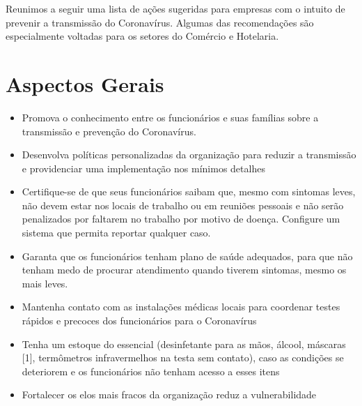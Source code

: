 \documentclass[onecolumn,journal]{IEEEtran}
\begin{document}
\begin{multicols}{2}


Reunimos a seguir uma lista de ações sugeridas para empresas com o intuito de prevenir a transmissão do Coronavírus. Algumas das recomendações são especialmente voltadas para os setores do Comércio e Hotelaria.

\section*{Aspectos Gerais}
\begin{itemize}
\item Promova o conhecimento entre os funcionários e suas famílias sobre a transmissão e prevenção do Coronavírus.
\item Desenvolva políticas personalizadas da organização para reduzir a transmissão e providenciar uma implementação nos mínimos detalhes
\item Certifique-se de que seus funcionários saibam que, mesmo com sintomas leves, não devem estar nos locais de trabalho ou em reuniões pessoais e não serão penalizados por faltarem no trabalho por motivo de doença. Configure um sistema que permita reportar qualquer caso.
\item Garanta que os funcionários tenham plano de saúde adequados, para que não tenham medo de procurar atendimento quando tiverem sintomas, mesmo os mais leves.
\item Mantenha contato com as instalações médicas locais para coordenar testes rápidos e precoces dos funcionários para o Coronavírus
\item Tenha um estoque do essencial (desinfetante para as mãos, álcool, máscaras [1], termômetros infravermelhos na testa sem contato), caso as condições se deteriorem e os funcionários não tenham acesso a esses itens
\item Fortalecer os elos mais fracos da organização reduz a vulnerabilidade
\end{itemize}


\end{multicols}
\end{document}
